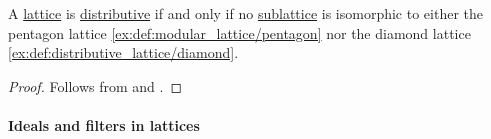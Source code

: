 \begin{corollary}\label{thm:distributive_lattice_characterization}
  A \hyperref[def:lattice]{lattice} is \hyperref[def:modular_lattice]{distributive} if and only if no \hyperref[def:lattice/submodel]{sublattice} is isomorphic to either the pentagon lattice \eqref{ex:def:modular_lattice/pentagon} nor the diamond lattice \eqref{ex:def:distributive_lattice/diamond}.
\end{corollary}
\begin{proof}
  Follows from  and .
\end{proof}

\paragraph{Ideals and filters in lattices}

